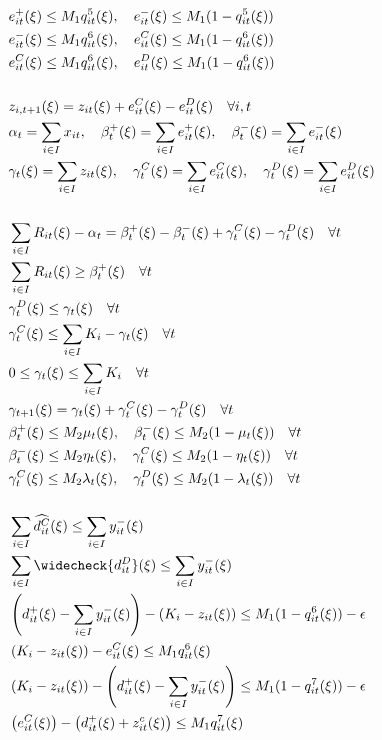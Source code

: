 \documentclass[10pt]{article}
\begin{document}
\begin{subequations}
\begin{align*}
    &e^{+}_{it}(\xi) \leq M_1 q^5_{it}(\xi), \quad e^{-}_{it}(\xi) \leq M_1 (1 - q^5_{it}(\xi)) &\\
    &e^{-}_{it}(\xi) \leq M_1 q^6_{it}(\xi), \quad e^{C}_{it}(\xi) \leq M_1 (1 - q^6_{it}(\xi)) &\\
    &e^{C}_{it}(\xi) \leq M_1 q^6_{it}(\xi), \quad e^{D}_{it}(\xi) \leq M_1 (1 - q^6_{it}(\xi)) &\\
    &&\\
    &z_{i,t+1}(\xi) = z_{it}(\xi) + e^C_{it}(\xi) - e^D_{it}(\xi) \quad \forall i, t &\\
    &\alpha_t = \sum_{i\in I}x_{it}, \quad \beta_t^+(\xi) = \sum_{i\in I}e^+_{it}(\xi), \quad \beta_t^-(\xi) = \sum_{i\in I}e^-_{it}(\xi)&\\
    &\gamma_t(\xi) = \sum_{i\in I}z_{it}(\xi), \quad \gamma^C_t(\xi) = \sum_{i\in I}e^C_{it}(\xi), \quad \gamma^D_t(\xi) = \sum_{i\in I}e^D_{it}(\xi)&\\
    &&\\
    & \sum_{i \in I} R_{it}(\xi) - \alpha_t = \beta^+_t(\xi) - \beta^-_t(\xi) + \gamma^C_t(\xi) - \gamma^D_t(\xi) \quad \forall t &\\
    &\sum_{i\in I}R_{it}(\xi) \geq \beta_{t}^{+}(\xi) \quad \forall t &\\ 
    &\gamma^D_t(\xi) \le \gamma_{t}(\xi) \quad \forall t &\\
    &\gamma^C_t(\xi) \le \sum_{i \in I}K_i - \gamma_{t}(\xi) \quad \forall t &\\
    &0 \leq \gamma_t(\xi) \leq \sum_{i \in I} K_i \quad \forall t &\\
    &\gamma_{t+1}(\xi) = \gamma_{t}(\xi) + \gamma^C_t(\xi) - \gamma^D_t(\xi) \quad \forall t &\\
    &\beta^+_t(\xi) \le M_2 \mu_t(\xi), \quad \beta^-_t(\xi) \le M_2 (1 - \mu_t(\xi)) \quad \forall t &\\ 
    &\beta^-_t(\xi) \le M_2 \eta_t(\xi), \quad \gamma^C_t(\xi) \le M_2 (1 - \eta_t(\xi))\quad \forall t &\\
    &\gamma^C_t(\xi) \le M_2\lambda_t(\xi), \quad \gamma^D_t(\xi) \le M_2(1 - \lambda_t(\xi)) \quad \forall t &\\
    &&\\
    &\sum_{i \in I}\widehat{d^{C}_{it}}(\xi) \leq \sum_{i \in I}y^-_{it}(\xi)&\\
    &\sum_{i \in I}\widecheck{d^{D}_{it}}(\xi) \leq \sum_{i \in I}y^-_{it}(\xi)&\\
    &\left(d^+_{it}(\xi) - \sum_{i \in I}y^-_{it}(\xi) \right) - \left(K_i - z_{it}(\xi)\right) \leq M_1(1-q^6_{it}(\xi))-\epsilon &\\
    &\left(K_i - z_{it}(\xi)\right) - e^C_{it}(\xi) \leq M_1 q^6_{it}(\xi)&\\
    &\left(K_i - z_{it}(\xi)\right) - \left(d^+_{it}(\xi) - \sum_{i \in I}y^-_{it}(\xi)\right) \leq M_1 (1-q^7_{it}(\xi))-\epsilon&\\
    & \left(e^C_{it}(\xi) \right) - \left( d^+_{it}(\xi) + z^c_{it}(\xi)\right) \leq M_1 q^7_{it}(\xi)&
    \end{align*}
\end{subequations}
\end{document}
